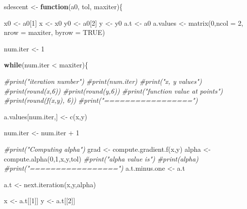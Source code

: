 \documentclass[
]{article}
\newenvironment{Shaded}{\begin{snugshade}}{\end{snugshade}}
\newcommand{\AttributeTok}[1]{\textcolor[rgb]{0.77,0.63,0.00}{#1}}
\newcommand{\CommentTok}[1]{\textcolor[rgb]{0.56,0.35,0.01}{\textit{#1}}}
\newcommand{\ConstantTok}[1]{\textcolor[rgb]{0.00,0.00,0.00}{#1}}
\newcommand{\ControlFlowTok}[1]{\textcolor[rgb]{0.13,0.29,0.53}{\textbf{#1}}}
\newcommand{\DecValTok}[1]{\textcolor[rgb]{0.00,0.00,0.81}{#1}}
\newcommand{\FunctionTok}[1]{\textcolor[rgb]{0.00,0.00,0.00}{#1}}
\newcommand{\NormalTok}[1]{#1}
\newcommand{\OtherTok}[1]{\textcolor[rgb]{0.56,0.35,0.01}{#1}}
\newcommand{\SpecialCharTok}[1]{\textcolor[rgb]{0.00,0.00,0.00}{#1}}
\begin{document}
\begin{Shaded}
\begin{Highlighting}[]
\NormalTok{sdescent }\OtherTok{\textless{}{-}} \ControlFlowTok{function}\NormalTok{(a0, tol, maxiter)\{}
  
\NormalTok{  x0 }\OtherTok{\textless{}{-}}\NormalTok{ a0[}\DecValTok{1}\NormalTok{]}
\NormalTok{  x }\OtherTok{\textless{}{-}}\NormalTok{ x0}
\NormalTok{  y0 }\OtherTok{\textless{}{-}}\NormalTok{ a0[}\DecValTok{2}\NormalTok{]}
\NormalTok{  y }\OtherTok{\textless{}{-}}\NormalTok{ y0}
\NormalTok{  a.t }\OtherTok{\textless{}{-}}\NormalTok{ a0}
\NormalTok{  a.values }\OtherTok{\textless{}{-}} \FunctionTok{matrix}\NormalTok{(}\DecValTok{0}\NormalTok{,}\AttributeTok{ncol =} \DecValTok{2}\NormalTok{, }\AttributeTok{nrow =}\NormalTok{ maxiter, }\AttributeTok{byrow =} \ConstantTok{TRUE}\NormalTok{)}
  
\NormalTok{  num.iter }\OtherTok{\textless{}{-}} \DecValTok{1}

  \ControlFlowTok{while}\NormalTok{(num.iter }\SpecialCharTok{\textless{}}\NormalTok{ maxiter)\{}
    
    \CommentTok{\#print("iteration number")}
    \CommentTok{\#print(num.iter)}
    \CommentTok{\#print("x, y values")}
    \CommentTok{\#print(round(x,6))}
    \CommentTok{\#print(round(y,6))}
    \CommentTok{\#print("function value at points")}
    \CommentTok{\#print(round(f(x,y), 6))}
    \CommentTok{\#print("=================")}
    
\NormalTok{    a.values[num.iter,] }\OtherTok{\textless{}{-}} \FunctionTok{c}\NormalTok{(x,y)}

\NormalTok{    num.iter }\OtherTok{\textless{}{-}}\NormalTok{ num.iter }\SpecialCharTok{+} \DecValTok{1}
    
    \CommentTok{\#print("Computing alpha")}
\NormalTok{    grad }\OtherTok{\textless{}{-}} \FunctionTok{compute.gradient.f}\NormalTok{(x,y)}
\NormalTok{    alpha }\OtherTok{\textless{}{-}} \FunctionTok{compute.alpha}\NormalTok{(}\DecValTok{0}\NormalTok{,}\DecValTok{1}\NormalTok{,x,y,tol)}
    \CommentTok{\#print("alpha value is")}
    \CommentTok{\#print(alpha)}
    \CommentTok{\#print("=================")}
\NormalTok{    a.t.minus.one }\OtherTok{\textless{}{-}}\NormalTok{ a.t}
    
\NormalTok{    a.t }\OtherTok{\textless{}{-}} \FunctionTok{next.iteration}\NormalTok{(x,y,alpha)}
    
    
\NormalTok{    x }\OtherTok{\textless{}{-}}\NormalTok{ a.t[[}\DecValTok{1}\NormalTok{]]}
\NormalTok{    y }\OtherTok{\textless{}{-}}\NormalTok{ a.t[[}\DecValTok{2}\NormalTok{]]}
    

\end{Highlighting}
\end{Shaded}
\end{document}
